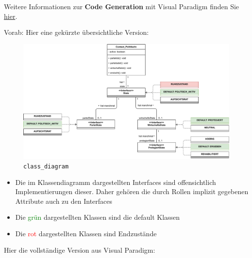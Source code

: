 \documentclass{article}
\begin{document}
\begin{enumerate}[label=\alph*.]
            Weitere Informationen zur \textbf{Code Generation} mit Visual Paradigm finden Sie \href{https://www.visual-paradigm.com/support/documents/vpuserguide/276/381/7486_generateorup.html}{hier}.

            Vorab: Hier eine gekürzte übersichtliche Version:

            \begin{figure}[ht]
                \includegraphics[width=\textwidth]{swt_wende_tim_h10_class_diagram.pdf}
                \caption{\texttt{class\_diagram}}
            \end{figure}
            
            \begin{itemize}
                \item Die im Klassendiagramm dargestellten Interfaces sind offensichtlich Implementierungen dieser.
                    Daher gehören die durch Rollen implizit gegebenen Attribute auch zu den Interfaces
                \item Die \textcolor{green}{grün} dargestellten Klassen sind die default Klassen
                \item Die \textcolor{red}{rot} dargestellten Klassen sind Endzustände
            \end{itemize}

            \newpage
            Hier die vollständige Version aus Visual Paradigm:


\end{enumerate}
\end{document}
